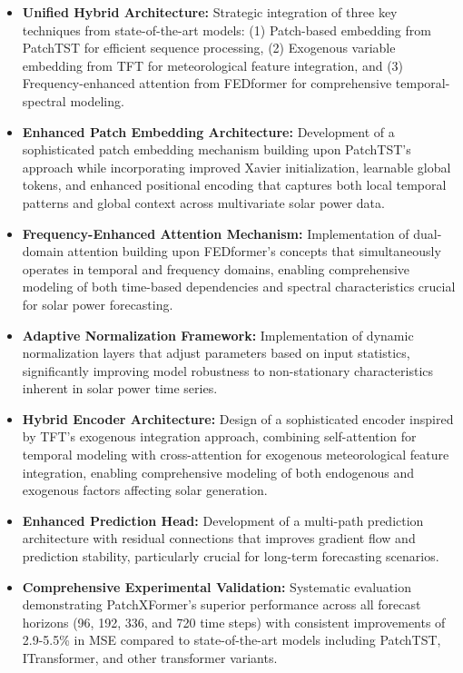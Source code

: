 \documentclass[12pt]{uomthesis}
\begin{document}
\begin{itemize}
    \item \textbf{Unified Hybrid Architecture:} Strategic integration of three key techniques from state-of-the-art models: (1) Patch-based embedding from PatchTST \cite{nie2022patchtst} for efficient sequence processing, (2) Exogenous variable embedding from TFT \cite{lim2021temporal} for meteorological feature integration, and (3) Frequency-enhanced attention from FEDformer \cite{zhou2022fedformer} for comprehensive temporal-spectral modeling.
    
    \item \textbf{Enhanced Patch Embedding Architecture:} Development of a sophisticated patch embedding mechanism building upon PatchTST's approach while incorporating improved Xavier initialization, learnable global tokens, and enhanced positional encoding that captures both local temporal patterns and global context across multivariate solar power data.
    
    \item \textbf{Frequency-Enhanced Attention Mechanism:} Implementation of dual-domain attention building upon FEDformer's concepts that simultaneously operates in temporal and frequency domains, enabling comprehensive modeling of both time-based dependencies and spectral characteristics crucial for solar power forecasting.
    
    \item \textbf{Adaptive Normalization Framework:} Implementation of dynamic normalization layers that adjust parameters based on input statistics, significantly improving model robustness to non-stationary characteristics inherent in solar power time series.
    
    \item \textbf{Hybrid Encoder Architecture:} Design of a sophisticated encoder inspired by TFT's exogenous integration approach, combining self-attention for temporal modeling with cross-attention for exogenous meteorological feature integration, enabling comprehensive modeling of both endogenous and exogenous factors affecting solar generation.
    
    \item \textbf{Enhanced Prediction Head:} Development of a multi-path prediction architecture with residual connections that improves gradient flow and prediction stability, particularly crucial for long-term forecasting scenarios.
    
    \item \textbf{Comprehensive Experimental Validation:} Systematic evaluation demonstrating PatchXFormer's superior performance across all forecast horizons (96, 192, 336, and 720 time steps) with consistent improvements of 2.9-5.5\% in MSE compared to state-of-the-art models including PatchTST, ITransformer, and other transformer variants.
    

\end{itemize}
\end{document}
